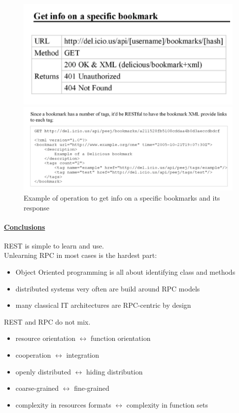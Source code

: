 \documentclass[10pt,a4paper]{article}
\begin{document}
 \begin{figure}[h!]
\begin{minipage}{.5\textwidth}
  \centering
  \includegraphics[width=.9\linewidth]{images/rest-op-ex2}
\end{minipage}%
\begin{minipage}{.5\textwidth}
  \centering
  \includegraphics[width=.9\linewidth]{images/rest-answer-ex2}
\end{minipage}
\caption{Example of operation to get info on a specific bookmarks and its response}
\end{figure}
\paragraph{\uline{Conclusions}}
REST is simple to learn and use. \\
Unlearning RPC in most cases is the hardest part:
\begin{itemize}
	\item Object Oriented programming is all about identifying class and methods
	\item distributed systems very often are build around RPC models
	\item many classical IT architectures are RPC-centric by design
\end{itemize}
REST and RPC do not mix.
\begin{itemize}
	\item resource orientation $\leftrightarrow$ function orientation
	\item cooperation $\leftrightarrow$ integration
	\item openly distributed $\leftrightarrow$ hiding distribution
	\item coarse-grained $\leftrightarrow$ fine-grained
	\item complexity in resources formats $\leftrightarrow$ complexity in function sets
\end{itemize}
\end{document}

